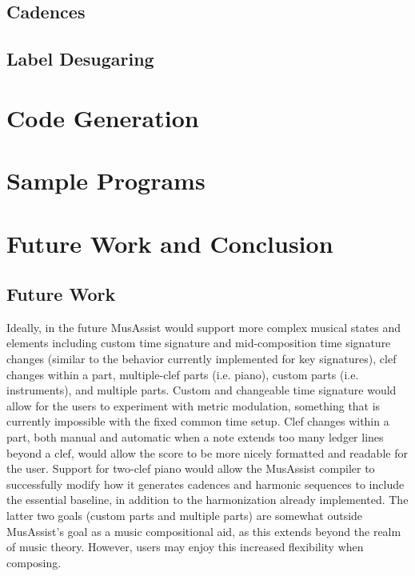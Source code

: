 \documentclass{report}
\begin{document}
\section{Cadences}
\section{Label Desugaring}

\chapter{Code Generation}

\chapter{Sample Programs}

\chapter{Future Work and Conclusion}
\section{Future Work}
Ideally, in the future MusAssist would support more complex musical states and elements including custom time signature and mid-composition time signature changes (similar to the behavior currently implemented for key signatures), clef changes within a part, multiple-clef parts (i.e. piano), custom parts (i.e. instruments), and multiple parts. Custom and changeable time signature would allow for the users to experiment with metric modulation, something that is currently impossible with the fixed common time setup. Clef changes within a part, both manual and automatic when a note extends too many ledger lines beyond a clef, would allow the score to be more nicely formatted and readable for the user. Support for two-clef piano would allow the MusAssist compiler to successfully modify how it generates cadences and harmonic sequences to include the essential baseline, in addition to the harmonization already implemented. The latter two goals (custom parts and multiple parts) are somewhat outside MusAssist's goal as a music compositional aid, as this extends beyond the realm of music theory. However, users may enjoy this increased flexibility when composing.
\end{document}
